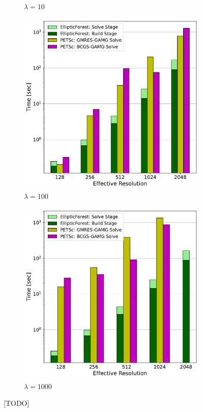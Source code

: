 \begin{figure}
\begin{subfigure}[t]{0.48\textwidth}
        \caption{$\lambda = 10$}
    \end{subfigure}
    \begin{subfigure}[t]{0.48\textwidth}
        \includegraphics[width=1\textwidth, clip=true, trim={15 25 50 60}]{figures/case03-l100-stacked-bar-plot-comparisons-no-title.pdf}
        \caption{$\lambda = 100$}
    \end{subfigure}
    \begin{subfigure}[t]{0.48\textwidth}
        \includegraphics[width=1\textwidth, clip=true, trim={15 25 50 60}]{figures/case03-l1000-stacked-bar-plot-comparisons-no-title.pdf}
        \caption{$\lambda = 1000$}
    \end{subfigure}
    \caption{[TODO]}
    \label{fig:case03-stacked-bar-plot}
\end{figure}


